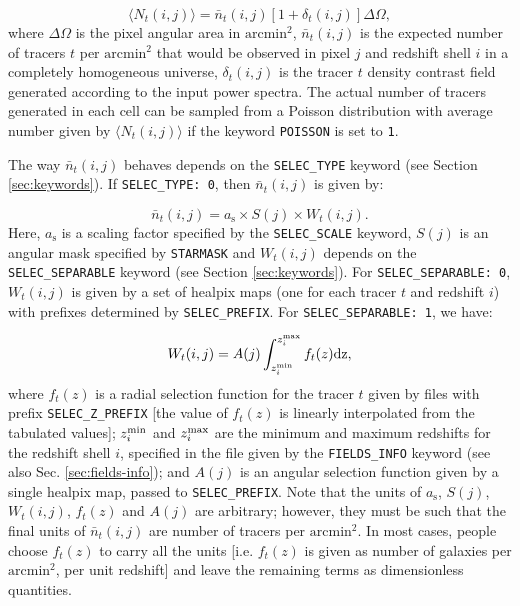 \documentclass[12pt]{book} %
\begin{document}
\begin{equation}
\langle N_t(i,j) \rangle = \bar{n}_t(i,j)[1+\delta_t(i,j)]\Delta\Omega,
\label{eq:tracer-number}
\end{equation}
where $\Delta\Omega$ is the pixel angular area in $\mathrm{arcmin}^2$, $\bar{n}_t(i,j)$ 
is the expected number of tracers $t$ per $\mathrm{arcmin}^2$ that would be observed 
in pixel $j$ and redshift shell $i$ in a completely homogeneous universe, 
$\delta_t(i,j)$ is the tracer $t$ density contrast field generated according 
to the input power spectra. The actual number of tracers generated in each cell can be sampled 
from a Poisson distribution with average number given by $\langle N_t(i,j) \rangle$ if the keyword 
{\tt POISSON} is set to {\tt 1}.

The way $\bar{n}_t(i,j)$ behaves depends on the {\tt SELEC\_TYPE} keyword (see Section \ref{sec:keywords}). 
If {\tt SELEC\_TYPE: 0}, then $\bar{n}_t(i,j)$ is given by:

\begin{equation}
\bar{n}_t(i,j) = a_{\mathrm{s}} \times S(j) \times W_t(i,j).  
\label{eq:selection-function} 
\end{equation}
Here, $a_{\mathrm{s}}$ is a scaling factor specified by the {\tt SELEC\_SCALE} keyword, 
$S(j)$ is an angular mask specified by {\tt STARMASK} and $W_t(i,j)$ depends on the 
{\tt SELEC\_SEPARABLE} keyword (see Section \ref{sec:keywords}). For 
{\tt SELEC\_SEPARABLE: 0}, $W_t(i,j)$ is given by a set of {\sc healpix} maps (one for 
each tracer $t$ and redshift $i$) with prefixes determined by {\tt SELEC\_PREFIX}. For 
{\tt SELEC\_SEPARABLE: 1}, we have:

\begin{equation}
W_t(i,j) = A(j)\int_{z^{\rm{min}}_i}^{z^{\rm{max}}_i} f_t(z) \rm{d}z,  
\label{eq:separable-selection-function} 
\end{equation}
where $f_t(z)$ is a radial selection function for the tracer $t$ 
given by files with prefix {\tt SELEC\_Z\_PREFIX} [the value of $f_t(z)$ 
is linearly interpolated from the tabulated values]; $z^{\rm{min}}_i$ and 
$z^{\rm{max}}_i$ are the minimum and maximum redshifts for the redshift shell $i$, 
specified in the file given by the {\tt FIELDS\_INFO} keyword (see also Sec. 
\ref{sec:fields-info}); and $A(j)$ is an 
angular selection function given by a single {\sc healpix} map, passed to {\tt SELEC\_PREFIX}. 
Note that the units of $a_{\mathrm{s}}$, $S(j)$, $W_t(i,j)$, $f_t(z)$ and $A(j)$ are arbitrary; 
however, they must be such that the final units of $\bar{n}_t(i,j)$ are number of tracers 
per $\mathrm{arcmin}^2$. In most cases, people choose $f_t(z)$ to carry 
all the units [i.e. $f_t(z)$ is given as number of galaxies per $\mathrm{arcmin}^2$, 
per unit redshift] and leave the remaining terms as dimensionless quantities.
\end{document}
